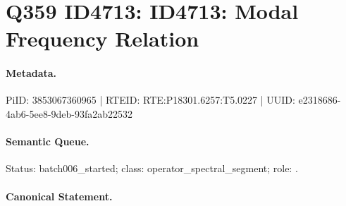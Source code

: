 \section*{Q359 ID4713: ID4713: Modal Frequency Relation}
\paragraph{Metadata.}
PiID: 3853067360965 | RTEID: RTE:P18301.6257:T5.0227 | UUID: e2318686-4ab6-5ee8-9deb-93fa2ab22532

\paragraph{Semantic Queue.}
Status: batch006\_started; class: operator\_spectral\_segment; role: .

\paragraph{Canonical Statement.}
